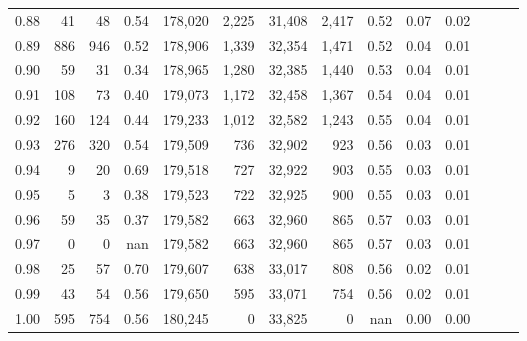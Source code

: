 \begin{tabular}{rrrrrrrrrrrrrr}
0.88 &      41 &     48 &  0.54 &  178,020 &    2,225 &  31,408 &   2,417 &  0.52 &  0.07 &      0.02 \\
0.89 &     886 &    946 &  0.52 &  178,906 &    1,339 &  32,354 &   1,471 &  0.52 &  0.04 &      0.01 \\
0.90 &      59 &     31 &  0.34 &  178,965 &    1,280 &  32,385 &   1,440 &  0.53 &  0.04 &      0.01 \\
0.91 &     108 &     73 &  0.40 &  179,073 &    1,172 &  32,458 &   1,367 &  0.54 &  0.04 &      0.01 \\
0.92 &     160 &    124 &  0.44 &  179,233 &    1,012 &  32,582 &   1,243 &  0.55 &  0.04 &      0.01 \\
0.93 &     276 &    320 &  0.54 &  179,509 &      736 &  32,902 &     923 &  0.56 &  0.03 &      0.01 \\
0.94 &       9 &     20 &  0.69 &  179,518 &      727 &  32,922 &     903 &  0.55 &  0.03 &      0.01 \\
0.95 &       5 &      3 &  0.38 &  179,523 &      722 &  32,925 &     900 &  0.55 &  0.03 &      0.01 \\
0.96 &      59 &     35 &  0.37 &  179,582 &      663 &  32,960 &     865 &  0.57 &  0.03 &      0.01 \\
0.97 &       0 &      0 &   nan &  179,582 &      663 &  32,960 &     865 &  0.57 &  0.03 &      0.01 \\
0.98 &      25 &     57 &  0.70 &  179,607 &      638 &  33,017 &     808 &  0.56 &  0.02 &      0.01 \\
0.99 &      43 &     54 &  0.56 &  179,650 &      595 &  33,071 &     754 &  0.56 &  0.02 &      0.01 \\
1.00 &     595 &    754 &  0.56 &  180,245 &        0 &  33,825 &       0 &   nan &  0.00 &      0.00 \\
\bottomrule
\end{tabular}

